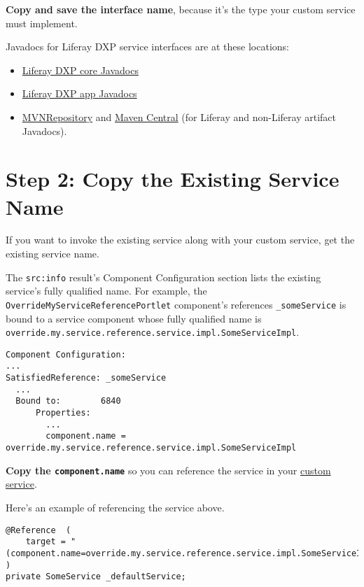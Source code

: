 \textbf{Copy and save the interface name}, because it's the type your
custom service must implement.

\noindent\hrulefill

Javadocs for Liferay DXP service interfaces are at these locations:

\begin{itemize}
\tightlist
\item
  \href{https://docs.liferay.com/dxp/portal/7.2-latest/javadocs/}{Liferay
  DXP core Javadocs}
\item
  \href{https://docs.liferay.com/dxp/apps}{Liferay DXP app Javadocs}
\item
  \href{https://mvnrepository.com/}{MVNRepository} and
  \href{https://search.maven.org/}{Maven Central} (for Liferay and
  non-Liferay artifact Javadocs).
\end{itemize}

\noindent\hrulefill

\section{Step 2: Copy the Existing Service
Name}\label{step-2-copy-the-existing-service-name}

If you want to invoke the existing service along with your custom
service, get the existing service name.

The \texttt{src:info} result's Component Configuration section lists the
existing service's fully qualified name. For example, the
\texttt{OverrideMyServiceReferencePortlet} component's references
\texttt{\_someService} is bound to a service component whose fully
qualified name is
\texttt{override.my.service.reference.service.impl.SomeServiceImpl}.

\begin{verbatim}
Component Configuration:
...
SatisfiedReference: _someService
  ...
  Bound to:        6840
      Properties:
        ...
        component.name = override.my.service.reference.service.impl.SomeServiceImpl
\end{verbatim}

\textbf{Copy the \texttt{component.name}} so you can reference the
service in your
\href{/docs/7-2/customization/-/knowledge_base/c/creating-a-custom-osgi-service}{custom
service}.

Here's an example of referencing the service above.

\begin{verbatim}
@Reference  (
    target = "(component.name=override.my.service.reference.service.impl.SomeServiceImpl)"
)
private SomeService _defaultService;
\end{verbatim}

